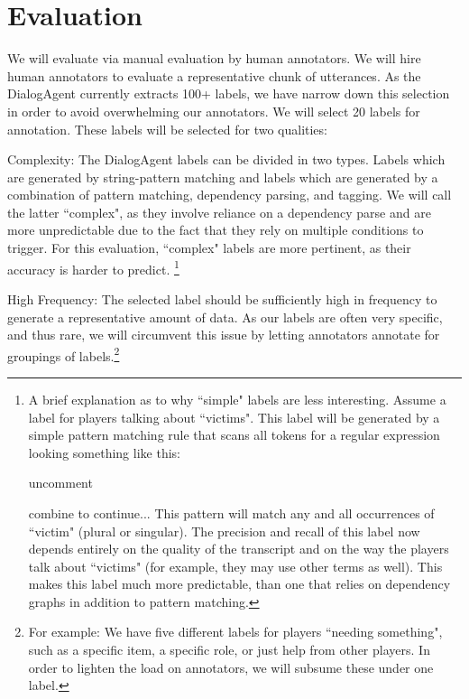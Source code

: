 \section{Evaluation}
We will evaluate via manual evaluation by human annotators. We will hire human annotators to evaluate a representative chunk of utterances. As the DialogAgent currently extracts 100+ labels, we have narrow down this selection in order to avoid overwhelming our annotators. 
We will select 20 labels for annotation. These labels will be selected for two qualities:
\begin{enumerate}
\item Complexity: The DialogAgent labels can be divided in two types. Labels which are generated by string-pattern matching and labels which are generated by a combination of pattern matching, dependency parsing, and tagging. We will call the latter ``complex", as they involve reliance on a dependency parse and are more unpredictable due to the fact that they rely on multiple conditions to trigger. For this evaluation, ``complex" labels are more pertinent, as their accuracy is harder to predict. \footnote{A brief explanation as to why ``simple" labels are less interesting. Assume a label for players talking about ``victims". This label will be generated by a simple pattern matching rule that scans all tokens for a regular expression looking something like this: 
\item uncomment %
\item combine to continue...   This pattern will match any and all occurrences of ``victim" (plural or singular). The precision and recall of this label now depends entirely on the quality of the transcript and on the way the players talk about ``victims" (for example, they may use other terms as well). This makes this label much more predictable, than one that relies on dependency graphs in addition to pattern matching.}
\item High Frequency: The selected label should be sufficiently high in frequency to generate a representative amount of data. As our labels are often very specific, and thus rare, we will circumvent this issue by letting annotators annotate for groupings of labels.\footnote{For example: We have five different labels for players ``needing something", such as a specific item, a specific role, or just help from other players. In order to lighten the load on annotators, we will subsume these under one label.}
\end{enumerate}

